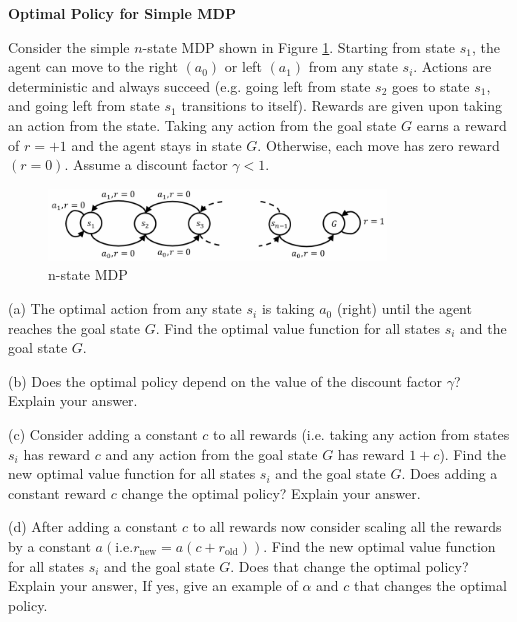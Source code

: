 \begin{homeworkProblem}
\textbf{Optimal Policy for Simple MDP}

Consider the simple $n$-state MDP shown in Figure \ref{fig:optimal_policy}. Starting from state $s_1$, the agent can move to the right $(a_0)$ or left $(a_1)$ from any state $s_i$. Actions are deterministic and always succeed (e.g. going left from state $s_2$ goes to state $s_1$, and going left from state $s_1$ transitions to itself). Rewards are given upon taking an action from the state. Taking any action from the goal state $G$ earns a reward of $r=+1$ and the agent stays in state $G$. Otherwise, each move has zero reward $(r=0)$. Assume a discount factor $\gamma<1$.

\begin{figure}[h]
    \centering
    \includegraphics[width=0.8\textwidth]{./figure/optimal_policy.png}
    \caption{n-state MDP}
    \label{fig:optimal_policy}
\end{figure}

(a) The optimal action from any state $s_i$ is taking $a_0$ (right) until the agent reaches the goal state $G$. Find the optimal value function for all states $s_i$ and the goal state $G$.

(b) Does the optimal policy depend on the value of the discount factor $\gamma$? Explain your answer.

(c) Consider adding a constant $c$ to all rewards (i.e. taking any action from states $s_i$ has reward $c$ and any action from the goal state $G$ has reward $1+c$). Find the new optimal value function for all states $s_i$ and the goal state $G$. Does adding a constant reward $c$ change the optimal policy? Explain your answer.

(d) After adding a constant $c$ to all rewards now consider scaling all the rewards by a constant $a \left(\text{i.e.} r_{\text{new}}=a\left(c+r_{\text{old}}\right)\right)$. Find the new optimal value function for all states $s_i$ and the goal state $G$. Does that change the optimal policy? Explain your answer, If yes, give an example of $\alpha$ and $c$ that changes the optimal policy.

\solution


\end{homeworkProblem}
